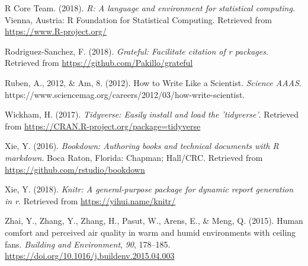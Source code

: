 \documentclass[]{elsarticle} %
\begin{document}
\hypertarget{ref-base}{}
R Core Team. (2018). \emph{R: A language and environment for statistical
computing}. Vienna, Austria: R Foundation for Statistical Computing.
Retrieved from \url{https://www.R-project.org/}

\hypertarget{ref-grateful}{}
Rodriguez-Sanchez, F. (2018). \emph{Grateful: Facilitate citation of r
packages}. Retrieved from \url{https://github.com/Pakillo/grateful}

\hypertarget{ref-rubenHowWriteScientist2012}{}
Ruben, A., 2012, \& Am, 8. (2012). How to Write Like a Scientist.
\emph{Science \textbar{} AAAS}.
https://www.sciencemag.org/careers/2012/03/how-write-scientist.

\hypertarget{ref-tidyverse}{}
Wickham, H. (2017). \emph{Tidyverse: Easily install and load the
'tidyverse'}. Retrieved from
\url{https://CRAN.R-project.org/package=tidyverse}

\hypertarget{ref-bookdown}{}
Xie, Y. (2016). \emph{Bookdown: Authoring books and technical documents
with R markdown}. Boca Raton, Florida: Chapman; Hall/CRC. Retrieved from
\url{https://github.com/rstudio/bookdown}

\hypertarget{ref-knitr}{}
Xie, Y. (2018). \emph{Knitr: A general-purpose package for dynamic
report generation in r}. Retrieved from \url{https://yihui.name/knitr/}

\hypertarget{ref-zhaiHumanComfortPerceived2015a}{}
Zhai, Y., Zhang, Y., Zhang, H., Pasut, W., Arens, E., \& Meng, Q.
(2015). Human comfort and perceived air quality in warm and humid
environments with ceiling fans. \emph{Building and Environment},
\emph{90}, 178--185.
\url{https://doi.org/10.1016/j.buildenv.2015.04.003}
\end{document}
